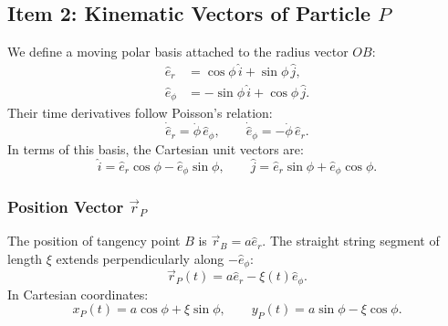 \documentclass[11pt,a4paper]{article}
\begin{document}
\subsection{Item 2: Kinematic Vectors of Particle $P$}
We define a moving polar basis attached to the radius vector $OB$:
\begin{align}
    \label{eq:basis_er}
    \hat{e}_r &= \cos\phi\,\hat{i} + \sin\phi\,\hat{j}, \\
    \label{eq:basis_ephi}
    \hat{e}_\phi &= -\sin\phi\,\hat{i} + \cos\phi\,\hat{j}.
\end{align}
Their time derivatives follow Poisson's relation:
\begin{equation}
    \label{eq:basis_derivs}
    \dot{\hat{e}}_r = \dot{\phi}\,\hat{e}_\phi, \qquad \dot{\hat{e}}_\phi = -\dot{\phi}\,\hat{e}_r.
\end{equation}
In terms of this basis, the Cartesian unit vectors are:
\begin{equation}
    \label{eq:cartesian_in_polar}
    \hat{i} = \hat{e}_r\cos\phi - \hat{e}_\phi\sin\phi, \qquad \hat{j} = \hat{e}_r\sin\phi + \hat{e}_\phi\cos\phi.
\end{equation}

\subsubsection{Position Vector $\vec{r}_P$}
The position of tangency point $B$ is $\vec{r}_B = a\hat{e}_r$. The straight string segment of length $\xi$ extends perpendicularly along $-\hat{e}_\phi$:
\begin{equation}
    \label{eq:pos_vector}
    \vec{r}_P(t) = a\hat{e}_r - \xi(t)\hat{e}_\phi.
\end{equation}
In Cartesian coordinates:
\begin{equation}
    \label{eq:pos_cartesian}
    x_P(t) = a\cos\phi + \xi\sin\phi, \qquad y_P(t) = a\sin\phi - \xi\cos\phi.
\end{equation}
\end{document}
